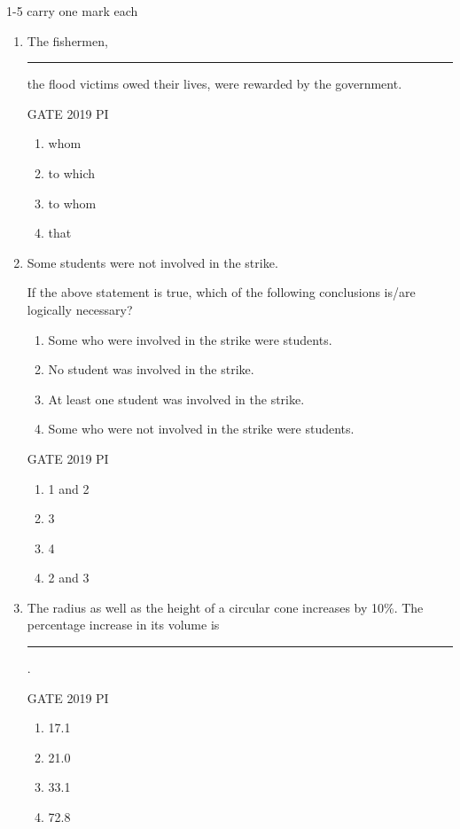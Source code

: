 \documentclass[journal,12pt,onecolumn]{IEEEtran}
\theoremstyle{remark}
\begin{document}
1-5 carry one mark each 
\begin{enumerate}
  \item The fishermen, \rule{2cm}{0.15mm} the flood victims owed their lives, were rewarded by the government.

\hfill{GATE 2019 PI}

\begin{multicols}{2}
\begin{enumerate}
    \item whom
    \item to which
    \item to whom
    \item that
\end{enumerate}
\end{multicols}

\item Some students were not involved in the strike.

If the above statement is true, which of the following conclusions is/are logically necessary?

\begin{enumerate}[label=\arabic*.]
    \item Some who were involved in the strike were students.
    \item No student was involved in the strike.
    \item At least one student was involved in the strike.
    \item Some who were not involved in the strike were students.
\end{enumerate}

\hfill{GATE 2019 PI}

\begin{multicols}{2}
\begin{enumerate}
    \item 1 and 2
    \item 3
    \item 4
    \item 2 and 3
\end{enumerate}
\end{multicols}


\item The radius as well as the height of a circular cone increases by 10\%. The percentage increase in its volume is \rule{2cm}{0.15mm}.

\hfill{GATE 2019 PI}

\begin{multicols}{2}
\begin{enumerate}
    \item 17.1
    \item 21.0
    \item 33.1
    \item 72.8
\end{enumerate}
\end{multicols}


\end{enumerate}
\end{document}
